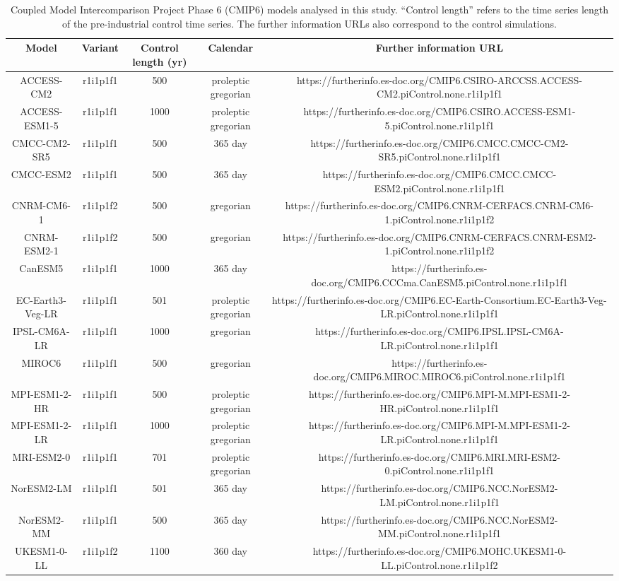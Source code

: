 \begin{table*}[t]
\centering
\caption{Coupled Model Intercomparison Project Phase 6 (CMIP6) models analysed in this study. ``Control length'' refers to the time series length of the pre-industrial control time series. The further information URLs also correspond to the control simulations. }
\begin{tabular}{ccccc}
\toprule
Model & Variant & Control length (yr) & Calendar & Further information URL \\
\midrule
ACCESS-CM2 & r1i1p1f1 & 500 & proleptic gregorian & https://furtherinfo.es-doc.org/CMIP6.CSIRO-ARCCSS.ACCESS-CM2.piControl.none.r1i1p1f1 \\
ACCESS-ESM1-5 & r1i1p1f1 & 1000 & proleptic gregorian & https://furtherinfo.es-doc.org/CMIP6.CSIRO.ACCESS-ESM1-5.piControl.none.r1i1p1f1 \\
CMCC-CM2-SR5 & r1i1p1f1 & 500 & 365 day & https://furtherinfo.es-doc.org/CMIP6.CMCC.CMCC-CM2-SR5.piControl.none.r1i1p1f1 \\
CMCC-ESM2 & r1i1p1f1 & 500 & 365 day & https://furtherinfo.es-doc.org/CMIP6.CMCC.CMCC-ESM2.piControl.none.r1i1p1f1 \\
CNRM-CM6-1 & r1i1p1f2 & 500 & gregorian & https://furtherinfo.es-doc.org/CMIP6.CNRM-CERFACS.CNRM-CM6-1.piControl.none.r1i1p1f2 \\
CNRM-ESM2-1 & r1i1p1f2 & 500 & gregorian & https://furtherinfo.es-doc.org/CMIP6.CNRM-CERFACS.CNRM-ESM2-1.piControl.none.r1i1p1f2 \\
CanESM5 & r1i1p1f1 & 1000 & 365 day & https://furtherinfo.es-doc.org/CMIP6.CCCma.CanESM5.piControl.none.r1i1p1f1 \\
EC-Earth3-Veg-LR & r1i1p1f1 & 501 & proleptic gregorian & https://furtherinfo.es-doc.org/CMIP6.EC-Earth-Consortium.EC-Earth3-Veg-LR.piControl.none.r1i1p1f1 \\
IPSL-CM6A-LR & r1i1p1f1 & 1000 & gregorian & https://furtherinfo.es-doc.org/CMIP6.IPSL.IPSL-CM6A-LR.piControl.none.r1i1p1f1 \\
MIROC6 & r1i1p1f1 & 500 & gregorian & https://furtherinfo.es-doc.org/CMIP6.MIROC.MIROC6.piControl.none.r1i1p1f1 \\
MPI-ESM1-2-HR & r1i1p1f1 & 500 & proleptic gregorian & https://furtherinfo.es-doc.org/CMIP6.MPI-M.MPI-ESM1-2-HR.piControl.none.r1i1p1f1 \\
MPI-ESM1-2-LR & r1i1p1f1 & 1000 & proleptic gregorian & https://furtherinfo.es-doc.org/CMIP6.MPI-M.MPI-ESM1-2-LR.piControl.none.r1i1p1f1 \\
MRI-ESM2-0 & r1i1p1f1 & 701 & proleptic gregorian & https://furtherinfo.es-doc.org/CMIP6.MRI.MRI-ESM2-0.piControl.none.r1i1p1f1 \\
NorESM2-LM & r1i1p1f1 & 501 & 365 day & https://furtherinfo.es-doc.org/CMIP6.NCC.NorESM2-LM.piControl.none.r1i1p1f1 \\
NorESM2-MM & r1i1p1f1 & 500 & 365 day & https://furtherinfo.es-doc.org/CMIP6.NCC.NorESM2-MM.piControl.none.r1i1p1f1 \\
UKESM1-0-LL & r1i1p1f2 & 1100 & 360 day & https://furtherinfo.es-doc.org/CMIP6.MOHC.UKESM1-0-LL.piControl.none.r1i1p1f2 \\
\bottomrule
\end{tabular}
\end{table*}
